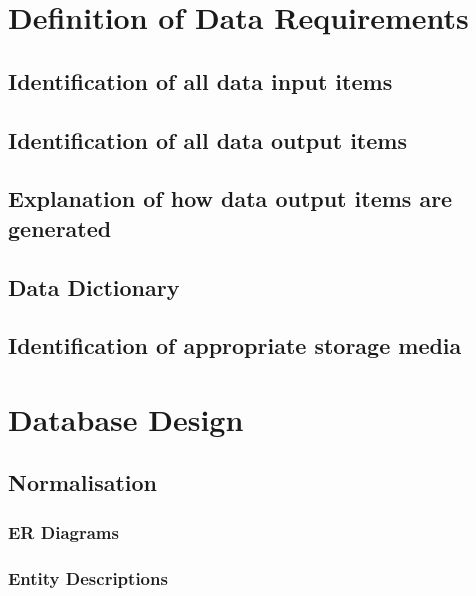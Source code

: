 
\section{Definition of Data Requirements}

\subsection{Identification of all data input items}

\subsection{Identification of all data output items}

\subsection{Explanation of how data output items are generated}

\subsection{Data Dictionary}


\subsection{Identification of appropriate storage media}


\section{Database Design}

\subsection{Normalisation}

\subsubsection{ER Diagrams}

\subsubsection{Entity Descriptions}

